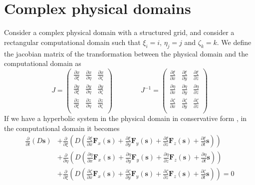 \documentclass[12pt, openany]{report}
\theoremstyle{definition}
\begin{document}
\section{Complex physical domains}
Consider a complex physical domain with a structured grid, and consider a rectangular computational domain such that $\xi_i=i$, $\eta_j=j$ and $\zeta_k=k$. We define the jacobian matrix of the transformation between the physical domain and the computational domain as 
\begin{equation}
	J = \begin{pmatrix}
		\frac{\partial x}{\partial \xi} & \frac{\partial x}{\partial \eta} & \frac{\partial x}{\partial \zeta}\\
		\frac{\partial y}{\partial \xi} & \frac{\partial y}{\partial \eta} & \frac{\partial y}{\partial \zeta}\\
		\frac{\partial z}{\partial \xi} & \frac{\partial z}{\partial \eta} & \frac{\partial z}{\partial \zeta}\\
	\end{pmatrix}\qquad \qquad 
	J^{-1} = \begin{pmatrix}
		\frac{\partial \xi}{\partial x} & \frac{\partial \xi}{\partial y} & \frac{\partial \xi}{\partial z}\\
		\frac{\partial \eta}{\partial x} & \frac{\partial \eta}{\partial y} & \frac{\partial \eta}{\partial z}\\
		\frac{\partial \zeta}{\partial x} & \frac{\partial \zeta}{\partial y} & \frac{\partial \zeta}{\partial z}\\
	\end{pmatrix}
\end{equation}
If we have a hyperbolic system in the physical domain in conservative form , in the computational domain it becomes 
\begin{equation}
	\begin{aligned}	
		\frac{\partial}{\partial t}(D\boldsymbol{s}) &+ \frac{\partial}{\partial \xi} \left(D\left(\frac{\partial \xi}{\partial x}\boldsymbol{F}_x(\boldsymbol{s}) + \frac{\partial \xi}{\partial y}\boldsymbol{F}_y(\boldsymbol{s}) + \frac{\partial \xi}{\partial z}\boldsymbol{F}_z(\boldsymbol{s})+\frac{\partial \xi}{\partial t}\boldsymbol{s}\right)\right) \\
		&+ \frac{\partial}{\partial \eta} \left(D\left(\frac{\partial \eta}{\partial x}\boldsymbol{F}_x(\boldsymbol{s}) + \frac{\partial \eta}{\partial y}\boldsymbol{F}_y(\boldsymbol{s}) + \frac{\partial \eta}{\partial z}\boldsymbol{F}_z(\boldsymbol{s})+\frac{\partial \eta}{\partial t}\boldsymbol{s}\right)\right)\\
		&+ \frac{\partial}{\partial \xi} \left(D\left(\frac{\partial \zeta}{\partial x}\boldsymbol{F}_x(\boldsymbol{s}) + \frac{\partial \zeta}{\partial y}\boldsymbol{F}_y(\boldsymbol{s}) + \frac{\partial \zeta}{\partial z}\boldsymbol{F}_z(\boldsymbol{s})+\frac{\partial \zeta}{\partial t}\boldsymbol{s}\right)\right) = 0
	\end{aligned}
\end{equation}
\end{document}
